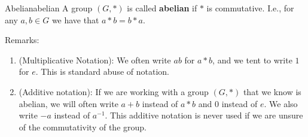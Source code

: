\documentclass{article}
\begin{document}
\begin{cdef}{Abelian}{abelian}
    A group $(G, *)$ is called \textbf{abelian} if $*$ is commutative. I.e., for any $a,b \in G$ we have that $a*b = b*a$.
\end{cdef}

Remarks:
\begin{enumerate}
    \item (Multiplicative Notation): We often write $ab$ for $a*b$, and we tent to write $1$ for $e$. This is standard abuse of notation.
    \item (Additive notation): If we are working with a group $(G, *)$ that we know is abelian, we will often write $a+b$ instead of $a*b$ and $0$ instead of $e$. We also write $-a$ instead of $a^{-1}$. This additive notation is never used if we are unsure of the commutativity of the group.
\end{enumerate}
\end{document}
